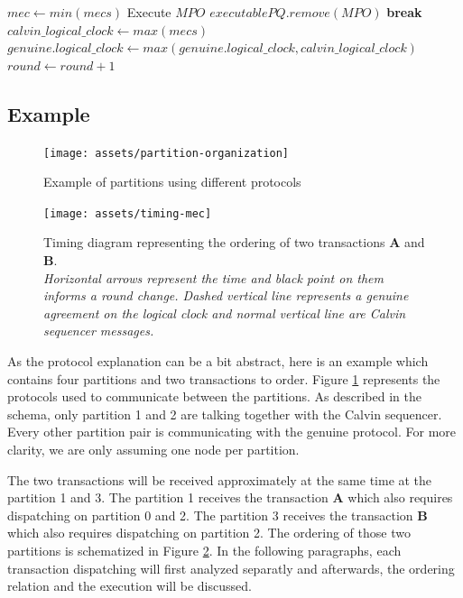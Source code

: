 \documentclass[a4paper, 10pt]{article}
\begin{document}
\begin{algorithmic}[1]
        \State
        \State $mec \gets min(mecs)$ \label{alg:line:execution}
        \State
                \State Execute $MPO$
                \State $executablePQ.remove(MPO)$
            \Else
                \State \textbf{break}
            \EndIf
        \EndFor \label{alg:line:execution:end}
        \State
        \State $calvin\_logical\_clock \gets max(mecs)$ \label{alg:line:val_update}
        \State $genuine.logical\_clock \gets max(genuine.logical\_clock, calvin\_logical\_clock)$ \label{alg:line:val_update:end}
        \State
        \State $round \gets round+1$

    \EndUpon
\end{algorithmic}

\subsection{Example}

\begin{figure}
    \centering
    \texttt{[image: assets/partition-organization]}
    \caption{Example of partitions using different protocols}
    \label{fig:partition}
\end{figure}
\begin{figure}
    \centering
    \texttt{[image: assets/timing-mec]}
    \caption{Timing diagram representing the ordering of two transactions \textbf{A} and \textbf{B}.\\
    \textit{Horizontal arrows represent the time and black point on them informs a round change.
    Dashed vertical line represents a genuine agreement on the logical clock and normal vertical line are
    Calvin sequencer messages.}}
    \label{fig:timing}
\end{figure}

As the protocol explanation can be a bit abstract, here is an example which contains four partitions and two transactions
to order. Figure \ref{fig:partition} represents the protocols used to communicate between the partitions. As described
in the schema, only partition 1 and 2 are talking together with the Calvin sequencer. Every other partition pair is communicating
with the genuine protocol. For more clarity, we are only assuming one node per partition.

The two transactions will be received approximately at the same time at the partition 1 and 3. The partition 1 receives the
transaction \textbf{A} which also requires dispatching on partition 0 and 2. The partition 3 receives the transaction \textbf{B} which
also requires dispatching on partition 2. The ordering of those two partitions is schematized in Figure \ref{fig:timing}.
In the following paragraphs, each transaction dispatching will first analyzed separatly and afterwards, the ordering relation
and the execution will be discussed.
\end{document}
